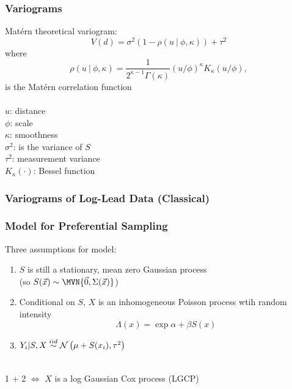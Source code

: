 \documentclass[xcolor=svgnames]{beamer}
\begin{document}
\begin{frame}
\frametitle{Variograms}

Mat\'{e}rn theoretical variogram:
$$ V(d) = \sigma^2(1- \rho(u \ \vert \ \phi, \kappa)) + \tau^2$$
where
$$\rho(u \ \vert \ \phi, \kappa) = \frac{1}{2^{\kappa - 1} \Gamma(\kappa)} (u/\phi)^{\kappa} K_\kappa(u/\phi), $$
is the Mat\'{e}rn correlation function\\~\\
$u$: distance\\
$\phi$: scale\\
$\kappa$: smoothness\\
$\sigma^2$: is the variance of $S$\\
$\tau^2$: measurement variance\\
$K_\kappa(\cdot)$: Bessel function

\end{frame}
\begin{frame}
\frametitle{Variograms of Log-Lead Data (Classical)}

 

\end{frame}
\begin{frame}
\frametitle{Model for Preferential Sampling}

Three assumptions for model:
\begin{enumerate}
\item $S$ is still a stationary, mean zero Gaussian process \\
(so $S(\v{x}) \sim \MVN{\v{0}, \Sigma(\v{x})}$)
\item Conditional on $S$, $X$ is an inhomogeneous Poisson process wtih random intensity
$$\Lambda(x) = \exp{\alpha + \beta S(x)}$$
\item $Y_i \vert S, X \stackrel{iid}{\sim} \mathcal{N} \left( \mu + S(x_i), \tau^2 \right)$
\end{enumerate}
~\\
1 + 2 $\Leftrightarrow$ $X$ is a log Gaussian Cox process (LGCP)

\end{frame}
\end{document}
